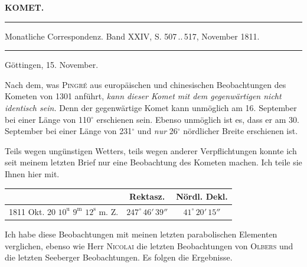 \clearpage{}
\begin{center}\textbf{KOMET.}\par\vspace{4pt}\hrule\vspace{4pt}\fontsize{10}{12}\selectfont Monatliche Correspondenz. Band XXIV, S. 507\,..\,517, November 1811.\par\vspace{4pt}\hrule\vspace{4pt}\end{center}

\begin{flushright}Göttingen, 15. November.\end{flushright}
\par\indent Nach dem, was \textsc{Pingré} aus europäischen und chinesischen Beobachtungen des Kometen von 1301 anführt, \emph{kann dieser Komet mit dem gegenwärtigen nicht identisch sein.} Denn der gegenwärtige Komet kann unmöglich am 16. September bei einer Länge von 110$^\circ$ erschienen sein. Ebenso unmöglich ist es, dass er am 30. September bei einer Länge von 231$^\circ$ und \emph{nur} 26$^\circ$ nördlicher Breite erschienen ist.


\par\indent Teils wegen ungünstigen Wetters, teils wegen anderer Verpflichtungen konnte ich seit meinem letzten Brief nur eine Beobachtung des Kometen machen. Ich teile sie Ihnen hier mit.

\begin{center}
\fontsize{10}{12}\selectfont\setlength{\tabcolsep}{3pt}\renewcommand{\arraystretch}{1.15}\begin{tabular}{l|c|c}
 & Rektasz. & Nördl. Dekl. \\ \hline
1811 Okt. 20 $10^{\mathrm u}$ $9^{\mathrm m}$ $12^{\mathrm s}$ m. Z. & $247^\circ\,46'\,39''$ & $41^\circ\,20'\,15''$ \\
\end{tabular}
\end{center}


\par\indent Ich habe diese Beobachtungen mit meinen letzten parabolischen Elementen verglichen, ebenso wie Herr \textsc{Nicolai} die letzten Beobachtungen von \textsc{Olbers} und die letzten Seeberger Beobachtungen. Es folgen die Ergebnisse.

